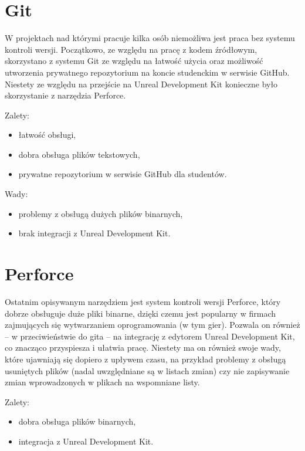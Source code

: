 \section{Git}

W projektach nad którymi pracuje kilka osób niemożliwa jest praca bez systemu kontroli wersji. Początkowo, ze względu na pracę z kodem źródłowym, skorzystano z systemu Git ze względu na łatwość użycia oraz możliwość utworzenia prywatnego repozytorium na koncie studenckim w serwisie GitHub. Niestety ze względu na przejście na Unreal Development Kit konieczne było skorzystanie z narzędzia Perforce.\\

\raggedright Zalety:
\begin{itemize}
\item łatwość obsługi,
\item dobra obsługa plików tekstowych,
\item prywatne repozytorium w serwisie GitHub dla studentów.
\end{itemize}

\raggedright Wady:
\begin{itemize}
\item problemy z obsługą dużych plików binarnych,
\item brak integracji z Unreal Development Kit.
\end{itemize}

\section{Perforce}

Ostatnim opisywanym narzędziem jest system kontroli wersji Perforce, który dobrze obsługuje duże pliki binarne, dzięki czemu jest popularny w firmach zajmujących się wytwarzaniem oprogramowania (w tym gier). Pozwala on również -- w przeciwieństwie do gita -- na integrację z edytorem Unreal Development Kit, co znacząco przyspiesza i ułatwia pracę. Niestety ma on również swoje wady, które ujawniają się dopiero z upływem czasu, na przykład problemy z obsługą usuniętych plików (nadal uwzględniane są w listach zmian) czy nie zapisywanie zmian wprowadzonych w plikach na wspomniane listy.

\raggedright Zalety:
\begin{itemize}
\item dobra obsługa plików binarnych,
\item integracja z Unreal Development Kit.
\end{itemize}

